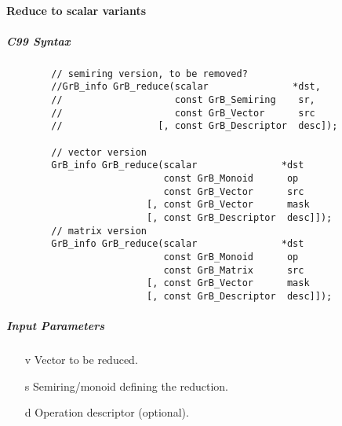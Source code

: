 \paragraph{Reduce to scalar variants}

\subparagraph{C99 Syntax}

\begin{verbatim}
        // semiring version, to be removed?
        //GrB_info GrB_reduce(scalar               *dst,
        //                    const GrB_Semiring    sr,
        //                    const GrB_Vector      src
        //                 [, const GrB_Descriptor  desc]);
                         
        // vector version
        GrB_info GrB_reduce(scalar               *dst
                            const GrB_Monoid      op
                            const GrB_Vector      src
                         [, const GrB_Vector      mask
                         [, const GrB_Descriptor  desc]]);
        // matrix version
        GrB_info GrB_reduce(scalar               *dst
                            const GrB_Monoid      op
                            const GrB_Matrix      src
                         [, const GrB_Vector      mask
                         [, const GrB_Descriptor  desc]]);
\end{verbatim}



\subparagraph{Input Parameters}

\begin{itemize}
    \item[{\sf v}] Vector to be reduced.
    \item[{\sf s}] Semiring/monoid defining the reduction.
    \item[{\sf d}] Operation descriptor (optional).
\end{itemize}

